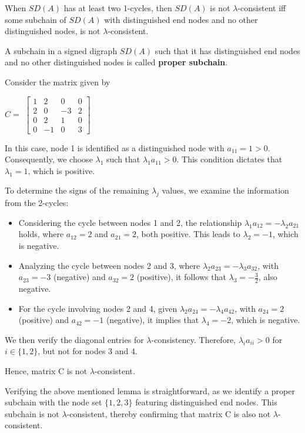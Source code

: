\begin{lem}
	  When $SD(A)$ has at least two 1-cycles, then $SD(A)$ is not $\lambda$-consistent iff some subchain of $SD(A)$ with distinguished end nodes and no other distinguished nodes, is not $\lambda$-consistent.
\end{lem}

\begin{dfn}
	A subchain in a signed digraph $SD(A)$ such that it has distinguished end nodes and no other distinguished nodes is called \textbf{proper subchain}.
\end{dfn}

\begin{example}
		Consider the matrix given by
	\begin{center}
		$ C =$ 
		$	\begin{bmatrix}
			1 & 2 & 0 & 0\\
			2 & 0 & -3 & 2\\
			0 & 2 &  1 & 0 \\
			0 & -1 & 0 & 3
		\end{bmatrix}$
	\end{center} 
  In this case, node 1 is identified as a distinguished node with \(a_{11} = 1 > 0\). Consequently, we choose \(\lambda_1\) such that \(\lambda_1 a_{11} > 0\). This condition dictates that \(\lambda_1 = 1\), which is positive.
  
  To determine the signs of the remaining \(\lambda_j\) values, we examine the information from the 2-cycles:
  \begin{itemize}
  	\item Considering the cycle between nodes 1 and 2, the relationship \(\lambda_1 a_{12} = -\lambda_2 a_{21}\) holds, where \(a_{12} = 2\) and \(a_{21} = 2\), both positive. This leads to \(\lambda_2 = -1\), which is negative.
  	\item Analyzing the cycle between nodes 2 and 3, where \(\lambda_2 a_{23} = -\lambda_3 a_{32}\), with \(a_{23} = -3\) (negative) and \(a_{32} = 2\) (positive), it follows that \(\lambda_3 = -\frac{3}{2}\), also negative.
  	\item For the cycle involving nodes 2 and 4, given \(\lambda_2 a_{24} = -\lambda_4 a_{42}\), with \(a_{24} = 2\) (positive) and \(a_{42} = -1\) (negative), it implies that \(\lambda_4 = -2\), which is negative.
  \end{itemize}
  
  We then verify the diagonal entries for \(\lambda\)-consistency. Therefore, \(\lambda_i a_{ii} > 0\) for \(i \in \{1, 2\}\), but not for nodes 3 and 4.
  
  Hence, matrix C is not \(\lambda\)-consistent.
  
  
\end{example}

Verifying the above mentioned lemma is straightforward, as we identify a proper subchain with the node set \(\{1, 2, 3\}\) featuring distinguished end nodes. This subchain is not \(\lambda\)-consistent, thereby confirming that matrix C is also not \(\lambda\)-consistent.
 



